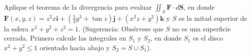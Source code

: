 \item Aplique el teorema de la divergencia para evaluar $\iint_S \mathbf{F} \cdot d\mathbf{S}$, en donde $\mathbf{F}(x, y, z) = z^2x\mathbf{i} + (\frac{1}{3}y^3 + \tan z)\mathbf{j} + (x^2z + y^2)\mathbf{k}$ y $S$ es la mitad superior de la esfera $x^2 + y^2 + z^2 = 1$. (Sugerencia: Obsérvese que $S$ no es una superficie cerrada. Primero calcule las integrales en $S_1$ y $S_2$, en donde $S_1$ es el disco $x^2 + y^2 \le 1$ orientado hacia abajo y $S_2 = S \cup S_1$).
